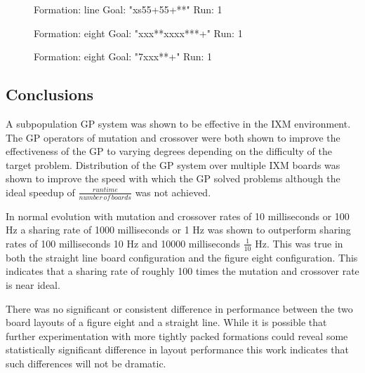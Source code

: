 \documentclass[11pt]{article}
\begin{document}
\begin{itemize}
  \begin{figure}
  \centering
  \caption{Formation: line Goal: "xs55+55+**" Run: 1}
  \end{figure}


  \begin{figure}
  \centering
  \caption{Formation: eight Goal: "xxx**xxxx***+" Run: 1}
  \end{figure}


  \begin{figure}
  \centering
  \caption{Formation: eight Goal: "7xxx**+" Run: 1}
  \end{figure}


\end{itemize} %
\subsection*{Conclusions}
\label{sec-1.6}

A subpopulation GP system was shown to be effective in the IXM
environment.  The GP operators of mutation and crossover were both
shown to improve the effectiveness of the GP to varying degrees
depending on the difficulty of the target problem.  Distribution of
the GP system over multiple IXM boards was shown to improve the speed
with which the GP solved problems although the ideal speedup of
$\frac{runtime}{number\,of\,boards}$ was not achieved.

In normal evolution with mutation and crossover rates of 10
milliseconds or 100 Hz a sharing rate of 1000 milliseconds or 1 Hz was
shown to outperform sharing rates of 100 milliseconds 10 Hz and 10000
milliseconds $\frac{1}{10}$ Hz.  This was true in both the straight
line board configuration and the figure eight configuration.  This
indicates that a sharing rate of roughly 100 times the mutation and
crossover rate is near ideal.

There was no significant or consistent difference in performance
between the two board layouts of a figure eight and a straight line.
While it is possible that further experimentation with more tightly
packed formations could reveal some statistically significant
difference in layout performance this work indicates that such
differences will not be dramatic.
\end{document}

